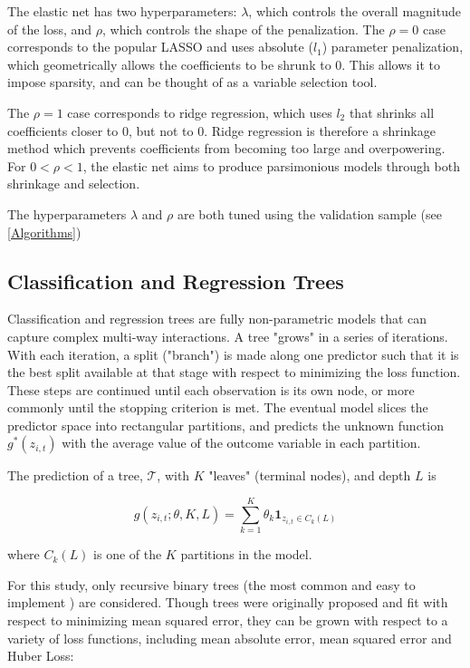 \documentclass[a4paper]{article}
\begin{document}
	The elastic net has two hyperparameters: $\lambda$, which controls the overall magnitude of the loss, and $\rho$, which controls the shape of the penalization. The $\rho = 0$ case corresponds to the popular LASSO and uses absolute ($l_1$) parameter penalization, which geometrically allows the coefficients to be shrunk to 0. This allows it to impose sparsity, and can be thought of as a variable selection tool.
	
	The $\rho = 1$ case corresponds to ridge regression, which uses $l_2$ that shrinks all coefficients closer to 0, but not to 0. Ridge regression is therefore a shrinkage method which prevents coefficients from becoming too large and overpowering. For \(0 < \rho < 1\), the elastic net aims to produce parsimonious models through both shrinkage and selection.
	
	The hyperparameters $\lambda$ and $\rho$ are both tuned using the validation sample (see \ref{Algorithms})
	
	\subsection{Classification and Regression Trees}
	
	Classification and regression trees are fully non-parametric models that can capture complex multi-way interactions. A tree "grows" in a series of iterations. With each iteration, a split ("branch") is made along one predictor such that it is the best split available at that stage with respect to minimizing the loss function. These steps are continued until each observation is its own node, or more commonly until the stopping criterion is met. The eventual model slices the predictor space into rectangular partitions, and predicts the unknown function $g^*(z_{i,t})$ with the average value of the outcome variable in each partition.
	
	The prediction of a tree, $\mathcal{T}$, with \(K\) "leaves" (terminal nodes), and depth $L$ is
	
	\begin{equation}
	g(z_{i,t};\theta,K,L) = \sum_{k=1}^{K}\theta_k\textbf{1}_{z_{i,t}\in C_k(L)}
	\end{equation}
	
	where $C_k(L)$ is one of the $K$ partitions in the model.
	
	For this study, only recursive binary trees (the most common and easy to implement ) are considered. Though trees were originally proposed and fit with respect to minimizing mean squared error, they can be grown with respect to a variety of loss functions, including mean absolute error, mean squared error and Huber Loss:
	
\end{document}
